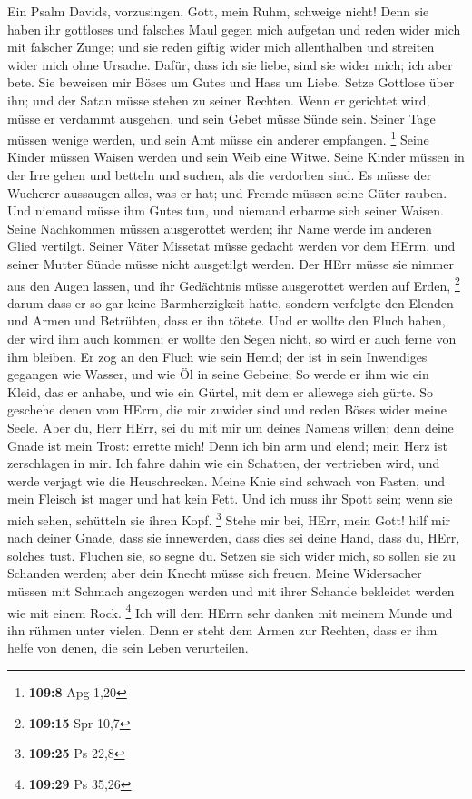  Ein Psalm Davids, vorzusingen. Gott, mein Ruhm, schweige
nicht!  Denn sie haben ihr gottloses und falsches Maul
gegen mich aufgetan und reden wider mich mit falscher Zunge;
 und sie reden giftig wider mich allenthalben und streiten
wider mich ohne Ursache.  Dafür, dass ich sie liebe, sind
sie wider mich; ich aber bete.  Sie beweisen mir Böses um
Gutes und Hass um Liebe.  Setze Gottlose über ihn; und der
Satan müsse stehen zu seiner Rechten.  Wenn er gerichtet
wird, müsse er verdammt ausgehen, und sein Gebet müsse Sünde sein.
 Seiner Tage müssen wenige werden, und sein Amt müsse ein
anderer empfangen. \footnote{\textbf{109:8} Apg 1,20} 
Seine Kinder müssen Waisen werden und sein Weib eine Witwe.
 Seine Kinder müssen in der Irre gehen und betteln und
suchen, als die verdorben sind.  Es müsse der Wucherer
aussaugen alles, was er hat; und Fremde müssen seine Güter rauben.
 Und niemand müsse ihm Gutes tun, und niemand erbarme
sich seiner Waisen.  Seine Nachkommen müssen ausgerottet
werden; ihr Name werde im anderen Glied vertilgt.  Seiner
Väter Missetat müsse gedacht werden vor dem HErrn, und seiner Mutter
Sünde müsse nicht ausgetilgt werden.  Der HErr müsse sie
nimmer aus den Augen lassen, und ihr Gedächtnis müsse ausgerottet werden
auf Erden, \footnote{\textbf{109:15} Spr 10,7}  darum
dass er so gar keine Barmherzigkeit hatte, sondern verfolgte den Elenden
und Armen und Betrübten, dass er ihn tötete.  Und er
wollte den Fluch haben, der wird ihm auch kommen; er wollte den Segen
nicht, so wird er auch ferne von ihm bleiben.  Er zog an
den Fluch wie sein Hemd; der ist in sein Inwendiges gegangen wie Wasser,
und wie Öl in seine Gebeine;  So werde er ihm wie ein
Kleid, das er anhabe, und wie ein Gürtel, mit dem er allewege sich
gürte.  So geschehe denen vom HErrn, die mir zuwider sind
und reden Böses wider meine Seele.  Aber du, Herr HErr,
sei du mit mir um deines Namens willen; denn deine Gnade ist mein Trost:
errette mich!  Denn ich bin arm und elend; mein Herz ist
zerschlagen in mir.  Ich fahre dahin wie ein Schatten,
der vertrieben wird, und werde verjagt wie die Heuschrecken.
 Meine Knie sind schwach von Fasten, und mein Fleisch ist
mager und hat kein Fett.  Und ich muss ihr Spott sein;
wenn sie mich sehen, schütteln sie ihren Kopf. \footnote{\textbf{109:25}
  Ps 22,8}  Stehe mir bei, HErr, mein Gott! hilf mir nach
deiner Gnade,  dass sie innewerden, dass dies sei deine
Hand, dass du, HErr, solches tust.  Fluchen sie, so segne
du. Setzen sie sich wider mich, so sollen sie zu Schanden werden; aber
dein Knecht müsse sich freuen.  Meine Widersacher müssen
mit Schmach angezogen werden und mit ihrer Schande bekleidet werden wie
mit einem Rock. \footnote{\textbf{109:29} Ps 35,26}  Ich
will dem HErrn sehr danken mit meinem Munde und ihn rühmen unter vielen.
 Denn er steht dem Armen zur Rechten, dass er ihm helfe
von denen, die sein Leben verurteilen.

